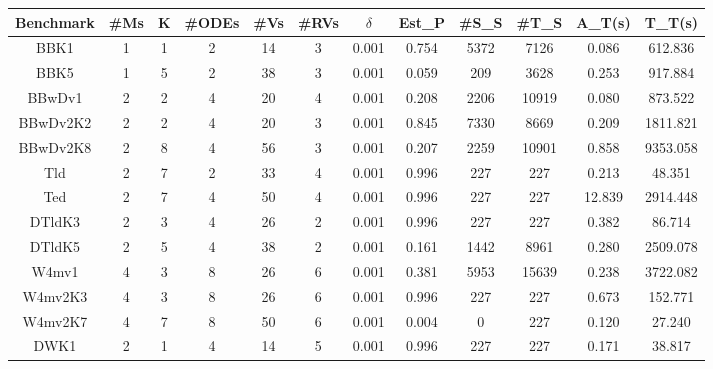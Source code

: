\begin{table}[h]
\captionsetup{font=scriptsize}
\centering
    \begin{tabular}{c|c|c|c|c|c|c|c|c|c|c|c}
    \hline
    Benchmark & \#Ms & K & \#ODEs & \#Vs & \#RVs & $\delta$ & Est\_P & \#S\_S & \#T\_S &  A\_T(s) & T\_T(s)  \\ \hline
    BBK1      & 1       & 1 & 2      & 14    & 3     & 0.001 & 0.754  & 5372      & 7126     & 0.086  & 612.836         \\ \hline
    BBK5      & 1       & 5 & 2      & 38    & 3     & 0.001 & 0.059  & 209       & 3628     & 0.253   &  917.884       \\ \hline
    BBwDv1    & 2       & 2 & 4      & 20    & 4     & 0.001 & 0.208  & 2206      & 10919    & 0.080   &  873.522     \\ \hline
    BBwDv2K2  & 2       & 2 & 4      & 20    & 3     & 0.001 & 0.845  & 7330      & 8669     & 0.209    & 1811.821      \\ \hline
    BBwDv2K8  & 2       & 8 & 4      & 56    & 3     & 0.001 & 0.207  & 2259      & 10901    & 0.858  & 9353.058        \\ \hline
    Tld       & 2       & 7 & 2      & 33     & 4     & 0.001 & 0.996      & 227         & 227        & 0.213     & 48.351         \\ \hline
    Ted       & 2       & 7 & 4      & 50     & 4     & 0.001 & 0.996      & 227         & 227       & 12.839   & 2914.448     \\ \hline
    DTldK3    & 2       & 3 & 4      & 26    & 2     & 0.001 & 0.996  & 227       & 227      & 0.382    & 86.714      \\ \hline
    DTldK5    & 2       & 5 & 4      & 38    & 2     & 0.001 & 0.161  & 1442      & 8961     & 0.280  &  2509.078       \\ \hline
    W4mv1       & 4       & 3 & 8      & 26     & 6     & 0.001 & 0.381      & 5953         & 15639        & 0.238   & 3722.082     \\ \hline
    W4mv2K3       & 4       & 3 & 8      & 26     & 6     & 0.001 & 0.996      & 227         & 227        & 0.673   & 152.771      \\ \hline
    W4mv2K7       & 4       & 7 & 8      & 50     & 6     & 0.001 & 0.004     & 0         & 227        & 0.120    & 27.240          \\ \hline
    DWK1      & 2       & 1 & 4      & 14    & 5     & 0.001 & 0.996  & 227       & 227      & 0.171   & 38.817      \\ \hline

\end{tabular}
\end{table}
